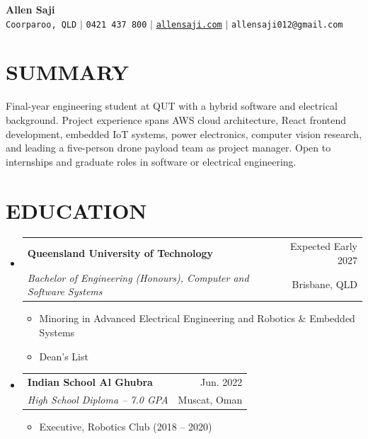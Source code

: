 \documentclass[letterpaper,11pt]{article}
\makeatletter
\newcommand{\resumeItem}[1]{
  \item\small{
    {#1 \vspace{-1pt}}
  }
}
\newcommand{\resumeSubheading}[4]{
  \vspace{-1pt}\item
    \begin{tabular*}{\textwidth}[t]{l@{\extracolsep{\fill}}r}
      \textbf{#1} & {\color{dark-grey}\small #2}\vspace{1pt}\\
      \textit{#3} & {\color{dark-grey} \small #4}\\
    \end{tabular*}\vspace{-4pt}
}
\newcommand{\resumeSubHeadingListStart}{\begin{itemize}[leftmargin=0in, label={}]}
\newcommand{\resumeSubHeadingListEnd}{\end{itemize}}
\newcommand{\resumeItemListStart}{\begin{itemize}}
\newcommand{\resumeItemListEnd}{\end{itemize}\vspace{0pt}}
\makeatother
\begin{document}
\begin{center}
    \textbf{\Huge Allen Saji} \\ \vspace{5pt}
    \small \faMapMarker* \hspace{2pt} \texttt{Coorparoo, QLD} \hspace{1pt} $|$
    \hspace{1pt} \faPhone* \hspace{2pt} \texttt{0421 437 800} \hspace{1pt} $|$
    \hspace{1pt} \faGlobe \hspace{2pt} \href{https://allensaji.com}{\texttt{allensaji.com}} \hspace{1pt} $|$
    \hspace{1pt} \faEnvelope \hspace{2pt} \texttt{allensaji012@gmail.com}
    \\ \vspace{-3pt}
\end{center}

\section{SUMMARY}
\small{Final-year engineering student at QUT with a hybrid software and electrical background. Project experience spans AWS cloud architecture, React frontend development, embedded IoT systems, power electronics, computer vision research, and leading a five-person drone payload team as project manager. Open to internships and graduate roles in software or electrical engineering.}
\vspace{-4pt}

\section{EDUCATION}
  \resumeSubHeadingListStart
    \resumeSubheading
      {Queensland University of Technology}{Expected Early 2027}
      {Bachelor of Engineering (Honours), Computer and Software Systems}{Brisbane, QLD}
      \resumeItemListStart
        \resumeItem{Minoring in Advanced Electrical Engineering and Robotics \& Embedded Systems}
        \resumeItem{Dean's List}
      \resumeItemListEnd

    \resumeSubheading
      {Indian School Al Ghubra}{Jun. 2022}
      {High School Diploma -- 7.0 GPA}{Muscat, Oman}
      \resumeItemListStart
        \resumeItem{Executive, Robotics Club (2018 -- 2020)}
      \resumeItemListEnd
  \resumeSubHeadingListEnd
\end{document}
